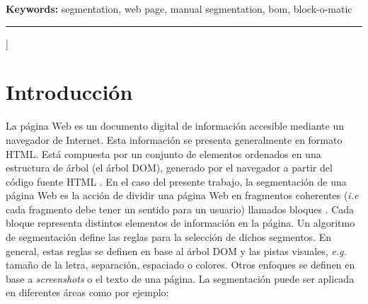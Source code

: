 \documentclass[10pt]{revecom}
\begin{document}
\begin{@twocolumnfalse}
\begin{center}
\begin{minipage}{0.95\textwidth}
\textbf{Keywords:} segmentation, web page, manual segmentation, bom, block-o-matic
\end{minipage}
\end{center}
\vspace{-0.1cm}
\begin{center}
\noindent\rule{510pt}{0.4pt}
\end{center}

\end{@twocolumnfalse} ]

\section{Introducción}
La página Web es un documento digital de información accesible mediante un navegador de Internet.
Esta información se presenta generalmente en formato HTML. 
Está compuesta por un conjunto de elementos ordenados en una estructura de árbol (el árbol DOM), generado por el navegador a partir del código fuente HTML \cite{Zhu:18:WD}.
%
En el caso del presente trabajo, la segmentación de una página Web es la acción de dividir una página Web en fragmentos coherentes (\emph{i.e} cada fragmento debe tener un sentido para un usuario) llamados bloques \cite{Sanoja:LIP6:2015}. 
%
Cada bloque representa distintos elementos de información en la página. 
%
Un algoritmo de segmentación define las reglas para la selección de dichos segmentos. En general, estas reglas se definen en base al árbol DOM y las pistas visuales, \emph{e.g.} tamaño de la letra, separación, espaciado o colores.
%
Otros enfoques se definen en base a \emph{screenshots} o el texto de una página.
%
La segmentación puede ser aplicada en diferentes áreas como por ejemplo: 
\end{document}
